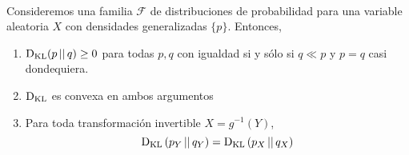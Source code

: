 \documentclass[main.tex]{subfiles}
\begin{document}
\begin{theorem} \ \\
Consideremos una familia $\mathcal{F}$ de distribuciones de probabilidad para una variable aleatoria $X$ con densidades generalizadas $\{p\}$. Entonces,
\begin{enumerate}[label=\roman*.]

\item $\operatorname*{D_{KL}}(p \operatorname*{\mid\mid} q) \geq 0$ para todas $p, q$ con igualdad si y sólo si $q \ll p$ y $p=q$ casi dondequiera.
\item $\operatorname*{D_{KL}}$ es convexa en ambos argumentos
\item Para toda transformación invertible $X=g^{-1}(Y)$,
		\begin{equation*}
			\operatorname*{D_{KL}}\left(p_Y\operatorname*{\mid\mid} q_Y\right) =
			\operatorname*{D_{KL}}\left(p_X\operatorname*{\mid\mid} q_X\right) 
		\end{equation*}

\end{enumerate}
\end{theorem}
\end{document}
